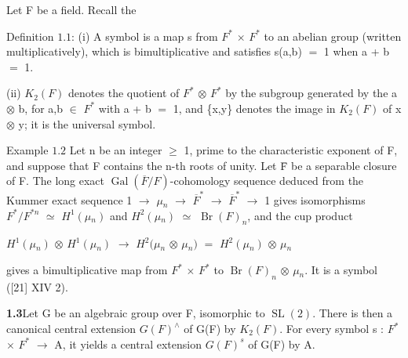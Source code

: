 \documentclass[10pt,a4paper]{article}
\begin{document}
\clearpage
{}
\label{d035-physical-009}
\par\medskip{}\par\smallskip
\par Let F be a field. Recall the\par
\par Definition $1.1$: (i) A symbol is a map s from $F^*$ $\times{}$ $F^*$ to an abelian group (written multiplicatively), which is bimultiplicative and satisfies s(a,b) $=$ 1 when a + b $=$ 1.\par
\par (ii) $K_2(F)$ denotes the quotient of $F^*$ $\otimes{}$ $F^*$ by the subgroup generated by the a $\otimes{}$ b, for a,b $\in{}$ $F^*$ with a + b $=$ 1, and \{x,y\} denotes the image in $K_2(F)$ of x $\otimes{}$ y; it is the universal symbol.\par
\par Example $1.2$ Let n be an integer $\ge{}$ 1, prime to the characteristic exponent of F, and suppose that F contains the n-th roots of unity. Let F̄ be a separable closure of F. The long exact $\operatorname{Gal}(\overline{F}/F)$-cohomology sequence deduced from the Kummer exact sequence 1 $\to{}$ $\mu{}_n$ $\to{}$ $\overline{F}^*$ $\to{}$ $\overline{F}^*$ $\to{}$ 1 gives isomorphisms $F^*/F^{*n}$ $\simeq{}$ $H^1(\mu{}_n)$ and $H^2(\mu{}_n)$ $\simeq{}$ $\operatorname{Br}(F)_n$, and the cup product\par
\par\smallskip\begin{center}\begin{minipage}{0.96\textwidth}\centering
$H^1(\mu{}_n)$ $\otimes{}$ $H^1(\mu{}_n)$ $\to{}$ $H^2(\mu{}_n$ $\otimes{}$ $\mu{}_n)$ $=$ $H^2(\mu{}_n)$ $\otimes{}$ $\mu{}_n$
\end{minipage}\end{center}\smallskip
\par gives a bimultiplicative map from $F^*$ $\times{}$ $F^*$ to $\operatorname{Br}(F)_n$ $\otimes{}$ $\mu{}_n$. It is a symbol ([21] XIV 2).\par
\par\noindent\textbf{1.3}\quad Let G be an algebraic group over F, isomorphic to $\operatorname{SL}(2)$. There is then a canonical central extension $G(F)^\wedge{}$ of G(F) by $K_2(F)$. For every symbol s : $F^*$ $\times{}$ $F^*$ $\to{}$ A, it yields a central extension $G(F)^s$ of G(F) by A.\par
\end{document}
